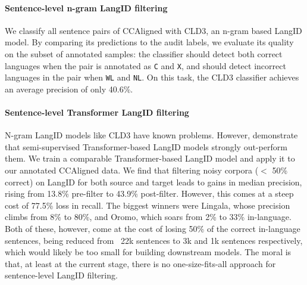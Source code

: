 \paragraph{Sentence-level n-gram LangID filtering}
We classify all sentence pairs of CCAligned with CLD3, an n-gram based LangID model. By comparing its predictions to the audit labels, we evaluate its quality on the subset of annotated samples: the classifier should detect both correct languages when the pair is annotated as \texttt{C} and \texttt{X}, and should detect incorrect languages in the pair when \texttt{WL} and \texttt{NL}. On this task, the CLD3 classifier
achieves an average precision of only 40.6\%. %

\paragraph{Sentence-level Transformer LangID filtering}
N-gram LangID models like CLD3 have known problems. However, \citet{caswell-etal-2020-language} demonstrate that semi-supervised Transformer-based LangID models strongly out-perform them. We train a comparable Transformer-based LangID model and apply it to our annotated CCAligned data. We find that filtering noisy corpora ($<$ 50\% correct) on LangID for both source and target leads to gains in median precision, rising from 13.8\% pre-filter to 43.9\% post-filter. However, this comes at a steep cost of 77.5\% loss in recall.
The biggest winners were Lingala, whose precision climbs from 8\% to 80\%, and Oromo, which soars from 2\% to 33\% in-language. Both of these, however, come at the cost of losing 50\% of the correct in-language sentences, being reduced from ~22k sentences to 3k and 1k sentences respectively, which would likely be too small for building downstream models. The moral is that, at least at the current stage, there is no one-size-fits-all approach for sentence-level LangID filtering.


